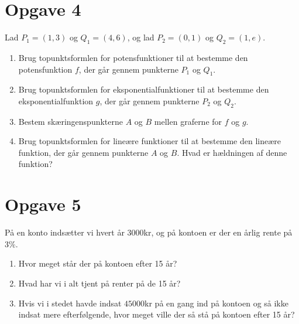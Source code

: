 \section*{Opgave 4}
Lad $P_1 = (1,3)$ og $Q_1 = (4,6)$, og lad $P_2 = (0,1)$ og $Q_2 = (1,e)$. 
\begin{enumerate}[label=\roman*)]
\item Brug topunktsformlen for potensfunktioner til at bestemme den potensfunktion $f$, der går gennem punkterne $P_1$ og $Q_1$.
\item Brug topunktsformlen for eksponentialfunktioner til at bestemme den eksponentialfunktion $g$, der går gennem punkterne $P_2$ og $Q_2$. 
\item Bestem skæringenspunkterne $A$ og $B$ mellen graferne for $f$ og $g$. 
\item Brug topunktsformlen for lineære funktioner til at bestemme den lineære funktion, der går gennem punkterne $A$ og $B$. Hvad er hældningen af denne funktion?
\end{enumerate}

\section*{Opgave 5}
På en konto indsætter vi hvert år $3000$kr, og på kontoen er der en årlig rente på $3\%$. 
\begin{enumerate}[label=\roman*)]
\item Hvor meget står der på kontoen efter 15 år?
\item Hvad har vi i alt tjent på renter på de 15 år?
\item Hvis vi i stedet havde indsat $45000$kr på en gang ind på kontoen og så ikke indsat mere efterfølgende, hvor meget ville der så stå på kontoen efter 15 år?
\end{enumerate}